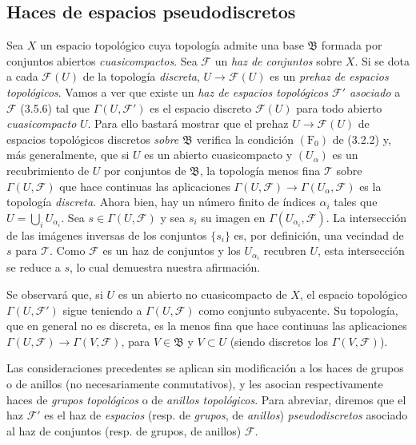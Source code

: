 
\subsection{Haces de espacios pseudodiscretos}

\begin{env}[3.8.1]
\label{0.3.8.1-fr}
Sea $X$ un espacio topológico cuya topología admite una base
$\mathfrak{B}$ formada por conjuntos abiertos \emph{cuasicompactos}. Sea
$\mathcal{F}$ un \emph{haz de conjuntos} sobre $X$. Si se dota a cada
$\mathcal{F}(U)$ de la topología \emph{discreta},
$U\to\mathcal{F}(U)$ es un \emph{prehaz de espacios topológicos}.
Vamos a ver que existe un \emph{haz de espacios topológicos
$\mathcal{F}'$ asociado} a $\mathcal{F}$ (3.5.6) tal que
$\Gamma(U,\mathcal{F}')$ es el espacio discreto $\mathcal{F}(U)$ para todo
abierto \emph{cuasicompacto} $U$. Para ello bastará mostrar que el
prehaz $U\to\mathcal{F}(U)$ de espacios topológicos discretos
\emph{sobre $\mathfrak{B}$} verifica la condición $(\mathrm{F}_0)$ de (3.2.2)
y, más generalmente, que si $U$ es un abierto cuasicompacto y
$(U_\alpha)$ es un recubrimiento de $U$ por conjuntos de $\mathfrak{B}$,
la topología menos fina $\mathcal{T}$ sobre $\Gamma(U,\mathcal{F})$ que hace
continuas las aplicaciones
$\Gamma(U,\mathcal{F})\to\Gamma(U_\alpha,\mathcal{F})$ es la topología
\emph{discreta}. Ahora bien, hay un número finito de índices $\alpha_i$ tales
que $U=\bigcup_i U_{\alpha_i}$. Sea $s\in\Gamma(U,\mathcal{F})$ y sea $s_i$
su imagen en $\Gamma(U_{\alpha_i},\mathcal{F})$. La intersección de las
imágenes inversas de los conjuntos $\{s_i\}$ es, por definición, una vecindad
de $s$ para $\mathcal{T}$. Como $\mathcal{F}$ es un haz de conjuntos y los
$U_{\alpha_i}$ recubren $U$, esta intersección se reduce a $s$, lo cual
demuestra nuestra afirmación.

Se observará que, si $U$ es un abierto no cuasicompacto de $X$, el espacio
topológico $\Gamma(U,\mathcal{F}')$ sigue teniendo a $\Gamma(U,\mathcal{F})$
como conjunto subyacente. Su topología, que en general no es discreta, es
la menos fina que hace continuas las aplicaciones
$\Gamma(U,\mathcal{F})\to\Gamma(V,\mathcal{F})$, para $V\in\mathfrak{B}$ y
$V\subset U$ (siendo discretos los $\Gamma(V,\mathcal{F})$).

Las consideraciones precedentes se aplican sin modificación a los haces de
grupos o de anillos (no necesariamente conmutativos), y les asocian
respectivamente haces de \emph{grupos topológicos} o de \emph{anillos
topológicos}. Para abreviar, diremos que el haz $\mathcal{F}'$ es el haz de
\emph{espacios} (resp. de \emph{grupos}, de \emph{anillos})
\emph{pseudodiscretos} asociado al haz de conjuntos (resp. de grupos,
de anillos) $\mathcal{F}$.
\end{env}
